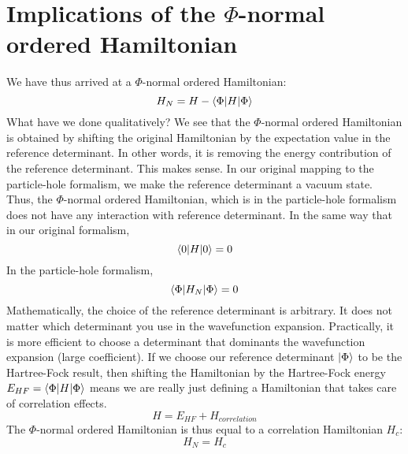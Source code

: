 \documentclass{article}
\newcommand{\kphi}{\ensuremath{\ket{\Phi}} }
\begin{document}
 \section{Implications of the $\Phi$-normal ordered Hamiltonian}
 We have thus arrived at a $\Phi$-normal ordered Hamiltonian:
 \[ H_N =  H-  \braket{\Phi |H|\Phi}\]
What have we done qualitatively? 
We see that the $\Phi$-normal ordered Hamiltonian is obtained by shifting the original Hamiltonian by the expectation value in the reference determinant. 
In other words, it is removing the energy contribution of the reference determinant. 
This makes sense. 
In our original mapping to the particle-hole formalism, we make the reference determinant a vacuum state. 
Thus, the $\Phi$-normal ordered Hamiltonian, which is in the particle-hole formalism does not have any interaction with reference determinant.
In the same way that in our original formalism,
\[\braket{0| H | 0} = 0\]
In the particle-hole formalism, 
\[\braket{\Phi| H_N | \Phi} = 0\]
 Mathematically, the choice of the reference determinant is arbitrary. It does not matter which determinant you use in the wavefunction expansion.
 Practically, it is more efficient to choose a determinant that dominants the wavefunction expansion (large coefficient). 
 If we choose our reference determinant \kphi to be the Hartree-Fock result, then shifting the Hamiltonian by the Hartree-Fock
 energy $E_{HF} = \braket{\Phi |H|\Phi}$ means we are really just defining a Hamiltonian that takes care of correlation effects. 
\[H = E_{HF} + H_{correlation} \]
 The $\Phi$-normal ordered Hamiltonian is thus equal to a correlation Hamiltonian $H_c$: 
 \[H_N = H_c \]
\end{document}
